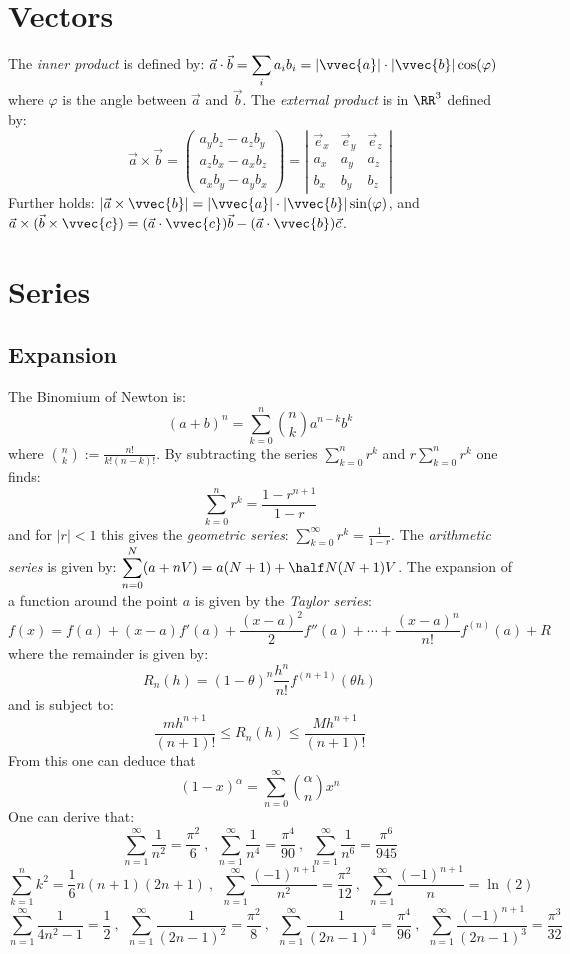 \section{Vectors}
The {\it inner product} is defined by:
$\displaystyle\vec{a}\cdot\vec{b}=\sum_i a_ib_i=|\vvec{a}|\cdot|\vvec{b}|\cos(\varphi)$
\npar
where $\varphi$ is the angle between $\vec{a}$ and $\vec{b}$. The {\it external
product} is in $\RR^3$ defined by:
\[
\vec{a}\times\vec{b}=\left(\begin{array}{c}
a_yb_z-a_zb_y\\
a_zb_x-a_xb_z\\
a_xb_y-a_yb_x\end{array}\right)=
\left|\begin{array}{ccc}
\vec{e}_x&\vec{e}_y&\vec{e}_z\\
a_x&a_y&a_z\\
b_x&b_y&b_z\end{array}\right|
\]
Further holds: $|\vec{a}\times\vvec{b}|=|\vvec{a}|\cdot|\vvec{b}|\sin(\varphi)$, and
$\vec{a}\times(\vec{b}\times\vvec{c})=(\vec{a}\cdot\vvec{c})\vec{b}-(\vec{a}\cdot\vvec{b})\vec{c}$.

\section{Series}
\subsection{Expansion}
The Binomium of Newton is:
\[
(a+b)^n=\sum_{k=0}^n{n\choose k}a^{n-k}b^k
\]
where $\displaystyle{n\choose k}:=\frac{n!}{k!(n-k)!}$.
\npar
By subtracting the series $\sum\limits_{k=0}^n r^k$ and $r\sum\limits_{k=0}^n r^k$
one finds:
\[
\sum_{k=0}^n r^k=\frac{1-r^{n+1}}{1-r}
\]
and for $|r|<1$ this gives the {\it geometric series}:
$\displaystyle\sum_{k=0}^\infty r^k=\frac{1}{1-r}$.
\npar
The {\it arithmetic series} is given by:
$\displaystyle\sum_{n=0}^N(a+nV)=a(N+1)+\half N(N+1)V$.
\npar
The expansion of a function around the point $a$ is given by the
{\it Taylor series}:
\[
f(x)=f(a)+(x-a)f'(a)+\frac{(x-a)^2}{2}f''(a)+\cdots+\frac{(x-a)^n}{n!}f^{(n)}(a)+R
\]
where the remainder is given by:
\[
R_n(h)=(1-\theta)^n\frac{h^n}{n!}f^{(n+1)}(\theta h)
\]
and is subject to:
\[
\frac{mh^{n+1}}{(n+1)!}\leq R_n(h)\leq\frac{Mh^{n+1}}{(n+1)!}
\]
From this one can deduce that
\[
(1-x)^\alpha=\sum_{n=0}^\infty{\alpha\choose n}x^n
\]
One can derive that:
\[
\sum_{n=1}^\infty\frac{1}{n^2}=\frac{\pi^2}{6}~,~~
\sum_{n=1}^\infty\frac{1}{n^4}=\frac{\pi^4}{90}~,~~
\sum_{n=1}^\infty\frac{1}{n^6}=\frac{\pi^6}{945}
\]
\[
\sum_{k=1}^nk^2=\mbox{$\frac{1}{6}$}n(n+1)(2n+1)~,~~
\sum_{n=1}^\infty\frac{(-1)^{n+1}}{n^2}=\frac{\pi^2}{12}~,~~
\sum_{n=1}^\infty\frac{(-1)^{n+1}}{n}=\ln(2)
\]
\[
\sum_{n=1}^\infty\frac{1}{4n^2-1}=\mbox{$\frac{1}{2}$}~,~~
\sum_{n=1}^\infty\frac{1}{(2n-1)^2}=\frac{\pi^2}{8}~,~~
\sum_{n=1}^\infty\frac{1}{(2n-1)^4}=\frac{\pi^4}{96}~,~~
\sum_{n=1}^\infty\frac{(-1)^{n+1}}{(2n-1)^3}=\frac{\pi^3}{32}
\]

